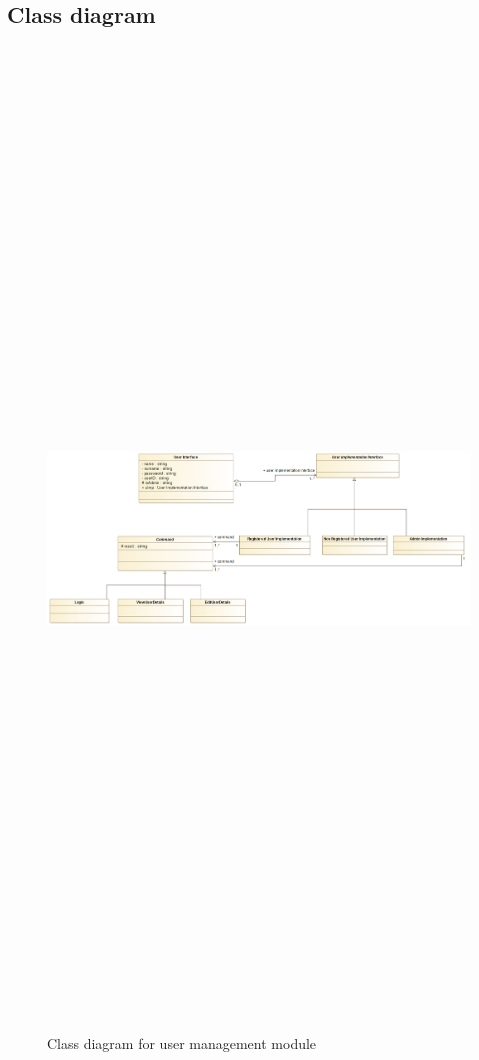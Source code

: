 \subsection{Class diagram}
\begin{figure}[H]
	\includegraphics[width=12cm,height=26cm,keepaspectratio]{Users/Pictures/User_Class_Diagram.png}
	\caption{Class diagram for user management module}\label{visina8}
\end{figure}
